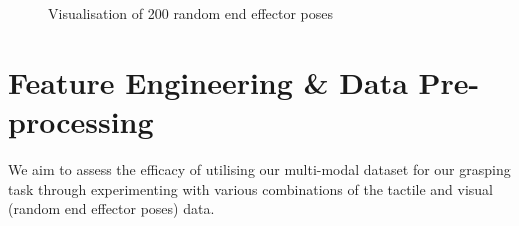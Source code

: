 \documentclass[11pt, a4paper]{report}
\begin{document}
\begin{figure}[H]%
    \centering
    \qquad
    \qquad
    \caption{Visualisation of 200 random end effector poses}%
    \label{fig:4.5}%
\end{figure}


\section{Feature Engineering \& Data Pre-processing}
\label{sec:4.4}
We aim to assess the efficacy of utilising our multi-modal dataset for our grasping task through experimenting with various combinations of the tactile and visual (random end effector poses) data.
\end{document}
